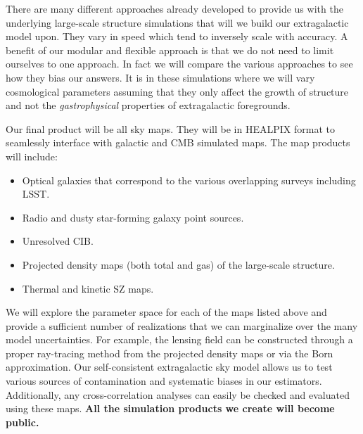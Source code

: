 There are many different approaches already developed to provide us with the underlying large-scale structure simulations that will we build our extragalactic model upon. They vary in speed which tend to inversely scale with accuracy. A benefit of our modular and flexible approach is that we do not need to limit ourselves to one approach. In fact we will compare the various approaches to see how they bias our answers. It is in these simulations where we will vary cosmological parameters assuming that they only affect the growth of structure and not the {\it gastrophysical} properties of extragalactic foregrounds.

Our final product will be all sky maps. They will be in HEALPIX format to seamlessly interface with galactic and CMB simulated maps. The map products will include:

\begin{itemize}
\item Optical galaxies that correspond to the various overlapping surveys including LSST.
\item Radio and dusty star-forming galaxy point sources.
\item Unresolved CIB.
\item Projected density maps (both total and gas) of the large-scale structure.
\item Thermal and kinetic SZ maps.
\end{itemize}

\noindent We will explore the parameter space for each of the maps listed above and provide a sufficient number of realizations that we can marginalize over the many model uncertainties. For example, the lensing field can be constructed through a proper ray-tracing method from the projected density maps or via the Born approximation. Our self-consistent extragalactic sky model allows us to test various sources of contamination and systematic biases in our estimators. Additionally, any cross-correlation analyses can easily be checked and evaluated using these maps. {\bf All the simulation products we create will become public.}

%



